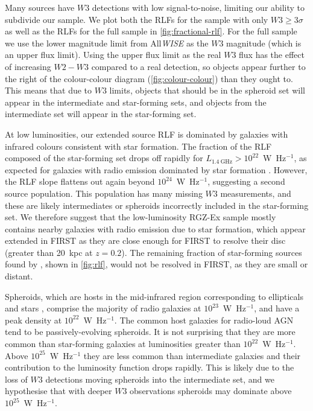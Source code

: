       Many sources have $W3$ detections with low signal-to-noise, limiting our ability to subdivide our sample. We plot both the RLFs for the sample with only $W3 \geq 3 \sigma$ as well as the RLFs for the full sample in \autoref{fig:fractional-rlf}. For the full sample we use the lower magnitude limit from All\emph{WISE} as the $W3$ magnitude (which is an upper flux limit). Using the upper flux limit as the real $W3$ flux has the effect of increasing $W2 - W3$ compared to a real detection, so objects appear further to the right of the colour-colour diagram (\autoref{fig:colour-colour}) than they ought to. This means that due to $W3$ limits, objects that should be in the spheroid set will appear in the intermediate and star-forming sets, and objects from the intermediate set will appear in the star-forming set.

      At low luminosities, our extended source RLF is dominated by galaxies with infrared
      colours consistent with star formation. The fraction
      of the RLF composed of the star-forming set drops off rapidly for
      $L_{1.4\ \mathrm{GHz}} > 10^{22}$~W~Hz$^{-1}$, as expected for galaxies with radio emission
      dominated by star formation \citep[e.g.][]{mauch07rlf}. However, the RLF slope flattens out again beyond $10^{24}$~W~Hz$^{-1}$, suggesting a second source population. This population has many missing $W3$ measurements, and these are likely intermediates or spheroids incorrectly included in the star-forming set. We therefore suggest that the
      low-luminosity RGZ-Ex sample mostly contains nearby galaxies with radio
      emission due to star formation, which appear extended in FIRST as they
      are close enough for FIRST to resolve their
      disc (greater than 20~kpc at $z = 0.2$). The remaining fraction of star-forming sources found by
      \citet{mauch07rlf}, shown in
      \autoref{fig:rlf}, would not be resolved in FIRST, as they are small or
      distant.

      Spheroids, which are hosts in the mid-infrared region corresponding to ellipticals and stars \citep{wright10wise}, comprise the majority of radio galaxies at $10^{23}$~W~Hz$^{-1}$,
      and have a peak density at $10^{22}$~W~Hz$^{-1}$. The common host galaxies for radio-loud AGN tend to be passively-evolving spheroids. It is not surprising that they are more common than star-forming galaxies at luminosities greater than $10^{22}$~W~Hz$^{-1}$. Above
      $10^{25}$~W~Hz$^{-1}$ they are less common than intermediate galaxies and
      their contribution to the luminosity function drops rapidly. This is likely due to the loss of $W3$ detections moving spheroids into the intermediate set, and we hypothesise that with deeper $W3$ observations spheroids may dominate above $10^{25}$~W~Hz$^{-1}$.

